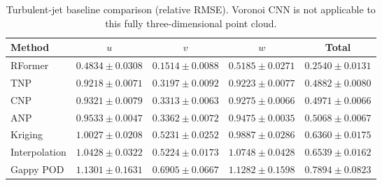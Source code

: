 \begin{table}[t]
  \centering
  \caption{Turbulent-jet baseline comparison (relative RMSE). Voronoi CNN is not applicable to this fully three-dimensional point cloud.}
  \label{tab:rformer:jet}
  \begin{tabular}{lcccc}
    \toprule
    Method & $u$ & $v$ & $w$ & Total \\
    \midrule
    RFormer       & $0.4834 \pm 0.0308$ & $0.1514 \pm 0.0088$ & $0.5185 \pm 0.0271$ & $\mathbf{0.2540 \pm 0.0131}$ \\
    TNP           & $0.9218 \pm 0.0071$ & $0.3197 \pm 0.0092$ & $0.9223 \pm 0.0077$ & $0.4882 \pm 0.0080$ \\
    CNP           & $0.9321 \pm 0.0079$ & $0.3313 \pm 0.0063$ & $0.9275 \pm 0.0066$ & $0.4971 \pm 0.0066$ \\
    ANP           & $0.9533 \pm 0.0047$ & $0.3362 \pm 0.0072$ & $0.9475 \pm 0.0035$ & $0.5068 \pm 0.0067$ \\
    Kriging       & $1.0027 \pm 0.0208$ & $0.5231 \pm 0.0252$ & $0.9887 \pm 0.0286$ & $0.6360 \pm 0.0175$ \\
    Interpolation & $1.0428 \pm 0.0322$ & $0.5224 \pm 0.0173$ & $1.0748 \pm 0.0428$ & $0.6539 \pm 0.0162$ \\
    Gappy POD     & $1.1301 \pm 0.1631$ & $0.6905 \pm 0.0667$ & $1.1282 \pm 0.1598$ & $0.7894 \pm 0.0823$ \\
    \bottomrule
  \end{tabular}
\end{table}
